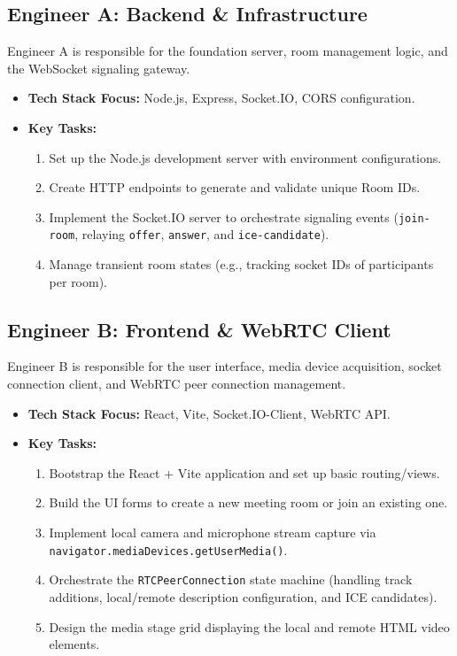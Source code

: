\documentclass[11pt,a4paper]{article}
\begin{document}
\subsection{Engineer A: Backend \& Infrastructure}
Engineer A is responsible for the foundation server, room management logic, and the WebSocket signaling gateway.
\begin{itemize}
    \item \textbf{Tech Stack Focus:} Node.js, Express, Socket.IO, CORS configuration.
    \item \textbf{Key Tasks:}
    \begin{enumerate}
        \item Set up the Node.js development server with environment configurations.
        \item Create HTTP endpoints to generate and validate unique Room IDs.
        \item Implement the Socket.IO server to orchestrate signaling events (\texttt{join-room}, relaying \texttt{offer}, \texttt{answer}, and \texttt{ice-candidate}).
        \item Manage transient room states (e.g., tracking socket IDs of participants per room).
    \end{enumerate}
\end{itemize}

\subsection{Engineer B: Frontend \& WebRTC Client}
Engineer B is responsible for the user interface, media device acquisition, socket connection client, and WebRTC peer connection management.
\begin{itemize}
    \item \textbf{Tech Stack Focus:} React, Vite, Socket.IO-Client, WebRTC API.
    \item \textbf{Key Tasks:}
    \begin{enumerate}
        \item Bootstrap the React + Vite application and set up basic routing/views.
        \item Build the UI forms to create a new meeting room or join an existing one.
        \item Implement local camera and microphone stream capture via \texttt{navigator.mediaDevices.getUserMedia()}.
        \item Orchestrate the \texttt{RTCPeerConnection} state machine (handling track additions, local/remote description configuration, and ICE candidates).
        \item Design the media stage grid displaying the local and remote HTML video elements.
    \end{enumerate}
\end{itemize}
\end{document}
